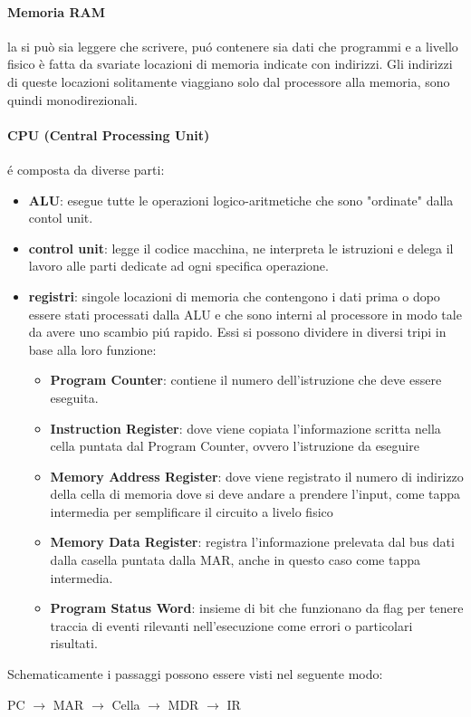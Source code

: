 \documentclass{article}
\begin{document}
\paragraph{Memoria RAM} la si può sia leggere che scrivere, puó contenere sia dati che programmi e a livello fisico è fatta da svariate locazioni di memoria indicate con indirizzi. Gli indirizzi di queste locazioni solitamente viaggiano solo dal processore alla memoria, sono quindi monodirezionali.


\paragraph{CPU (Central Processing Unit)} é composta da diverse parti:
\begin{itemize}
    \item \textbf{ALU}: esegue tutte le operazioni logico-aritmetiche che sono "ordinate" dalla contol unit.
    \item \textbf{control unit}: legge il codice macchina, ne interpreta le istruzioni e delega il lavoro alle parti dedicate ad ogni specifica operazione.
    \item \textbf{registri}: singole locazioni di memoria che contengono i dati prima o dopo essere stati processati dalla ALU e che sono interni al processore in modo tale da avere uno scambio piú rapido. Essi si possono dividere in diversi tripi in base alla loro funzione:
        \begin{itemize}
            \item \textbf{Program Counter}: contiene il numero dell'istruzione che deve essere eseguita.
            \item \textbf{Instruction Register}: dove viene copiata l'informazione scritta nella cella puntata dal Program Counter, ovvero l'istruzione da eseguire
            \item \textbf{Memory Address Register}: dove viene registrato il numero di indirizzo della cella di memoria dove si deve andare a prendere l'input, come tappa intermedia per semplificare il circuito a livelo fisico
            \item \textbf{Memory Data Register}: registra l'informazione prelevata dal bus dati dalla casella puntata dalla MAR, anche in questo caso come tappa intermedia.
            \item \textbf{Program Status Word}: insieme di bit che funzionano da flag per tenere traccia di eventi rilevanti nell'esecuzione come errori o particolari risultati.

        \end{itemize}
    
\end{itemize}
Schematicamente i passaggi possono essere visti nel seguente modo:
\begin{center}
     PC $\rightarrow$ MAR $\rightarrow$ Cella $\rightarrow$ MDR $\rightarrow$ IR
\end{center}
\end{document}

